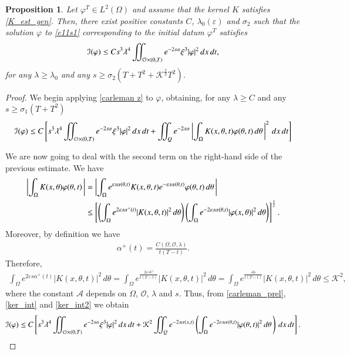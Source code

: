 \documentclass[preprint,1p]{elsarticle}
\newcommand{\intd}{\displaystyle\int \kern -7pt \int}
\newtheorem{proposition}{\bf Proposition}[section]
\begin{document}
\begin{proposition}\label{carleman_phi_prop} 
Let $\varphi^T\in L^2(\Omega)$ and assume that the kernel $K$ satisfies \eqref{K_est_gen}. Then, there exist positive constants $C$, $\lambda_0(\varepsilon)$ and $\sigma_2$ such that the solution $\varphi$ to \eqref{e11s1} corresponding to the initial datum $\varphi^T$ satisfies  
\begin{align}\label{e5s2}
	\mathcal{I}(\varphi) \leq C s^3\lambda^4\intd_{\mathcal O\times(0,T)} e^{-2s\alpha}\xi^3 |\varphi|^2\,dx\,dt, 
\end{align}
for any $\lambda\geq \lambda_0$ and any $s\geq \sigma_2\left(T + T^2 + \mathcal{K}^{\frac 23}T^2\right)$.
\end{proposition}
%
\begin{proof}
We begin applying \eqref{carleman z} to $\varphi$, obtaining, for any $\lambda\geq C$ and any $s\geq \sigma_1\left(T + T^2\right)$ 
\begin{align}\label{carleman_prel}
	\mathcal{I}(\varphi) \leq C \left[s^3\lambda^4\intd_{\mathcal O\times(0,T)} e^{-2s\alpha}\xi^3 |\varphi|^2\,dx\,dt + \intd_Q e^{-2s\alpha}\left|\int_{\Omega} K(x,\theta,t)\varphi(\theta,t)\,d\theta\,\right|^2\,dx\,dt\right]
\end{align}

We are now going to deal with the second term on the right-hand side of the previous estimate. We have
\begin{align}\label{ker_int}
	\left|\int_\Omega K(x,\theta)\varphi(\theta,t)\,\right| & = \left|\int_{\Omega} e^{\varepsilon s\alpha(\theta,t)}K(x,\theta,t)e^{-\varepsilon s\alpha(\theta,t)}\varphi(\theta,t)\,d\theta\,\right| \notag
	\\	
	&\leq \left[\left(\int_\Omega e^{2\varepsilon s\alpha^+(t)}|K(x,\theta,t)|^2\,d\theta\right)\left(\int_\Omega e^{-2\varepsilon s\alpha(\theta,t)}|\varphi(x,\theta)|^2\,d\theta\right)\right]^{\frac 12}.
\end{align}
Moreover, by definition we have
\begin{align*}
	\alpha^+(t)=\frac{C(\Omega,\mathcal{O},\lambda)}{t(T-t)}.
\end{align*}	
Therefore,
\begin{align}\label{ker_int2}
\int_\Omega e^{2\varepsilon s\alpha^+(t)}|K(x,\theta,t)|^2\,d\theta = \int_\Omega e^{\frac{2\varepsilon sC}{t(T-t)}}|K(x,\theta,t)|^2\,d\theta = \int_\Omega e^{\frac{\mathcal{A}\varepsilon}{t(T-t)}}|K(x,\theta,t)|^2\,d\theta \leq \mathcal{K}^2,
\end{align}
where the constant $\mathcal{A}$ depends on $\Omega$, $\mathcal{O}$, $\lambda$ and $s$. Thus, from \eqref{carleman_prel}, \eqref{ker_int} and \eqref{ker_int2} we obtain 
\begin{align*}
	\mathcal{I}(\varphi) \leq C \left[s^3\lambda^4\intd_{\mathcal O\times(0,T)} e^{-2s\alpha}\xi^3 |\varphi|^2\,dx\,dt + \mathcal{K}^2\intd_Q e^{-2s\alpha(x,t)}\left(\int_{\Omega} e^{-2\varepsilon s\alpha(\theta,t)}|\varphi(\theta,t)|^2\,d\theta\,\right)\,dx\,dt\right].
\end{align*}


\end{proof}
\end{document}
